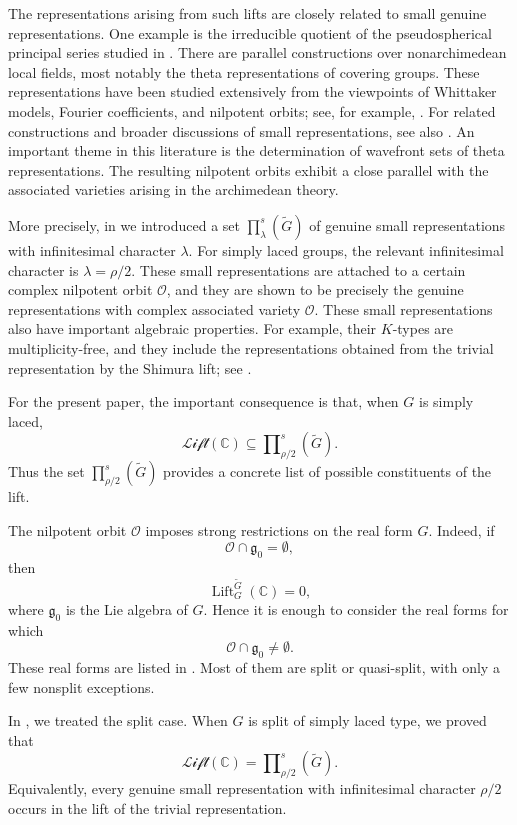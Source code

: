 \documentclass{amsart}
\DeclareMathOperator{\Lift}{Lift}
\newcommand{\LLift}{\mathscr{Lift}}
\newcommand{\bbC}{{\mathbb{C}}}
\newcommand{\fk}{\mathfrak}
\theoremstyle{definition}
\newcommand{\calO}{{\mathcal{O}}}
\newcommand{\tu}{\widetilde}
\begin{document}
\medskip
The representations arising from such lifts are closely related to
small genuine representations.  One example is  the
irreducible quotient of the pseudospherical principal series studied
in \cite{ABPTV07}.  There are parallel constructions over
nonarchimedean local fields, most notably the theta
representations of covering groups.  These representations have been
studied extensively from the viewpoints of Whittaker models, Fourier
coefficients, and nilpotent orbits; see, for example,
\cite{KP84,GRS97,Gao17,Cai19,GT22,GLT25}.  For related constructions
and broader discussions of small representations, see also
\cite{BFG03,Kap17}.  An important theme in this literature is the
determination of wavefront sets of theta representations.  The
resulting nilpotent orbits exhibit a close parallel with the associated
varieties arising in the archimedean theory.

\medskip
More precisely, in \cite{Ts19} we introduced a set
$
\prod\nolimits_\lambda^s(\tu G)
$
of genuine small representations with infinitesimal character
$\lambda$.  For simply laced groups, the relevant infinitesimal
character is $\lambda=\rho/2$.  These small representations are
attached to a certain complex nilpotent orbit $\calO$, and they are
shown to be precisely the genuine representations with complex
associated variety $\calO$.  These small representations also have
important algebraic properties.  For example, their $K$-types are
multiplicity-free, and they include the representations obtained from
the trivial representation by the Shimura lift; see \cite{ABPTV07}.

\medskip

For the present paper, the important consequence is that, when $G$ is
simply laced,
$$
\LLift(\bbC)\subseteq \prod\nolimits_{\rho/2}^s(\tu G).
$$
Thus the set $\prod\nolimits_{\rho/2}^s(\tu G)$ provides a concrete
list of possible constituents of the lift.

The nilpotent orbit $\calO$ imposes strong restrictions on the real
form $G$.  Indeed, if
$$
\calO\cap\fk g_0=\emptyset,
$$
then
$$
\Lift_G^{\tu G}(\bbC)=0,
$$
where $\fk g_0$ is the Lie algebra of $G$.  Hence it is enough to
consider the real forms for which
\begin{equation}\label{e:nonempty-cap}
\calO\cap\fk g_0\neq\emptyset.
\end{equation}
These real forms are listed in \cite[Table~2]{Ts19}.  Most of them are
split or quasi-split, with only a few nonsplit exceptions.

In \cite{Ts23}, we treated the split case.  When $G$ is split of
simply laced type, we proved that
$$
\LLift(\bbC)=
\prod\nolimits_{\rho/2}^s(\tu G).
$$
Equivalently, every genuine small representation with infinitesimal
character $\rho/2$ occurs in the lift of the trivial representation.
\end{document}

